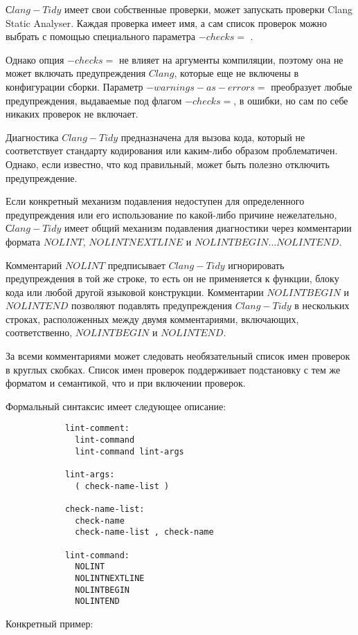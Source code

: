 \documentclass{mipt-thesis-bs}
\begin{document}
$Сlang-Tidy$ имеет свои собственные проверки, может запускать
проверки Clang Static Analyser. Каждая проверка имеет имя, 
а сам список проверок можно выбрать с помощью специального параметра $-checks=$ \cite{clang-tidy}.

Однако опция $-checks=$ не влияет на аргументы компиляции, поэтому она 
не может включать предупреждения $Clang$, которые еще не включены в
конфигурации сборки. Параметр $-warnings-as-errors=$ преобразует 
любые предупреждения, выдаваемые под флагом $-checks=$, в ошибки,
но сам по себе никаких проверок не включает.

Диагностика $Clang-Tidy$ предназначена для вызова кода, который не
соответствует стандарту кодирования или каким-либо образом проблематичен. 
Однако, если известно, что код правильный, может быть полезно отключить предупреждение.

Если конкретный механизм подавления недоступен для определенного 
предупреждения или его использование по какой-либо причине 
нежелательно, $Сlang-Tidy$ имеет общий механизм подавления 
диагностики через комментарии формата $NOLINT$,
$NOLINTNEXTLINE$ и $NOLINTBEGIN… NOLINTEND$.

Комментарий $NOLINT$ предписывает $Clang-Tidy$ игнорировать предупреждения
в той же строке, то есть он не применяется к функции, блоку кода или любой 
другой языковой конструкции.
Комментарии $NOLINTBEGIN$ и $NOLINTEND$ позволяют подавлять предупреждения 
$Clang-Tidy$ в нескольких строках, расположенных между двумя
комментариями, включающих, соответственно, $NOLINTBEGIN$ и $NOLINTEND$.

За всеми комментариями может следовать необязательный список имен 
проверок в круглых скобках. 
Список имен проверок поддерживает подстановку с тем же форматом 
и семантикой, что и при включении проверок.

Формальный синтаксис имеет следующее описание:
\begin{verbatim}
            lint-comment:
              lint-command
              lint-command lint-args

            lint-args:
              ( check-name-list )

            check-name-list:
              check-name
              check-name-list , check-name

            lint-command:
              NOLINT
              NOLINTNEXTLINE
              NOLINTBEGIN
              NOLINTEND
\end{verbatim}

Конкретный пример:
\end{document}
